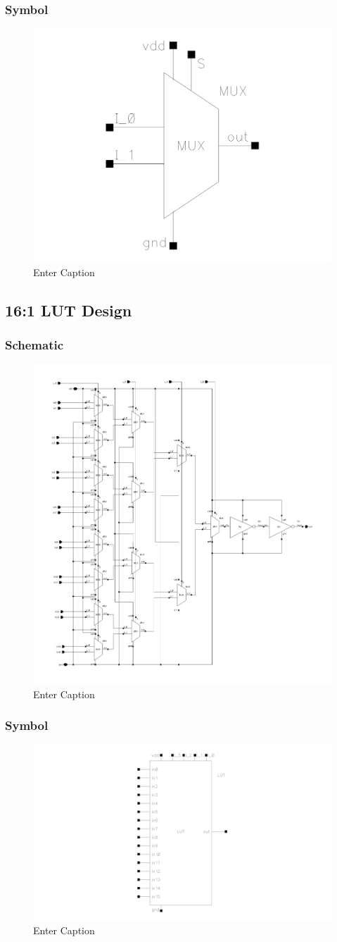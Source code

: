 \documentclass[12pt]{article}
\begin{document}
\subsubsection*{Symbol}

\begin{figure}[H]
    \centering
    \includegraphics[width=0.5\linewidth]{writeup//figures/MUX_sym.png}
    \caption{Enter Caption}
\end{figure}

\newpage

\subsection{16:1 LUT Design}
\subsubsection*{Schematic}
\begin{figure}[H]
    \centering
    \includegraphics[width=0.5\linewidth]{writeup//figures/LUT_sch.png}
    \caption{Enter Caption}
\end{figure}

\subsubsection*{Symbol}
\begin{figure}[H]
    \centering
    \includegraphics[width=0.5\linewidth]{writeup//figures/LUT_sym.png}
    \caption{Enter Caption}
\end{figure}
\end{document}
